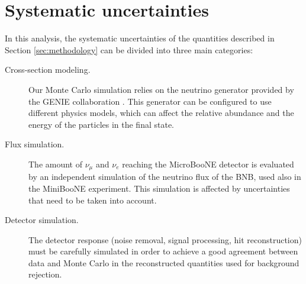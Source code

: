 \section{Systematic uncertainties}\label{sec:systematics}
In this analysis, the systematic uncertainties of the quantities described in Section \ref{sec:methodology} can be divided into three main categories: 
\begin{description}
\item[Cross-section modeling.] Our Monte Carlo simulation relies on the neutrino generator provided by the GENIE collaboration \cite{Andreopoulos:2009rq}. This generator can be configured to use different physics models, which can affect the relative abundance and the energy of the particles in the final state.
\item[Flux simulation.] The amount of $\nu_{\mu}$ and $\nu_{e}$ reaching the MicroBooNE detector is evaluated by an independent simulation of the neutrino flux of the BNB, used also in the MiniBooNE experiment. This simulation is affected by uncertainties that need to be taken into account.
\item[Detector simulation.] The detector response (noise removal, signal processing, hit reconstruction) must be carefully simulated in order to achieve a good agreement between data and Monte Carlo in the reconstructed quantities used for background rejection. 
\end{description}

